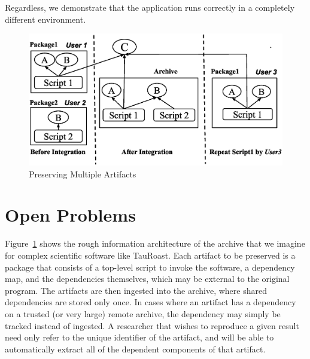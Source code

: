 \documentclass{sig-alternate}
\begin{document}
Regardless, we demonstrate that the application runs correctly in a completely different environment.

\begin{figure}
\centering
\includegraphics[width=1\columnwidth]{preservation-integration.eps}
\caption{Preserving Multiple Artifacts}
\label{fig:Preservation integration}
\end{figure}

\section{Open Problems}

Figure~\ref{fig:Preservation integration} shows the rough information
architecture of the archive that we imagine for complex
scientific software like TauRoast.
Each artifact to be preserved is a package that consists of a top-level
script to invoke the software, a dependency map, and the dependencies
themselves, which may be external to the original program.  The artifacts
are then ingested into the archive, where shared dependencies are stored
only once.  In cases where an artifact has a dependency on a trusted
(or very large) remote archive, the dependency may simply be tracked
instead of ingested. A researcher that wishes to reproduce a given
result need only refer to the unique identifier of the artifact, and will
be able to automatically extract all of the dependent components of
that artifact.
\end{document}
